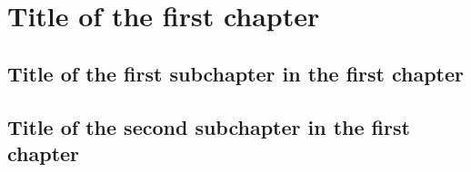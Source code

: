 \chapter{Title of the first chapter}

\section{Title of the first subchapter in the first chapter}

\section{Title of the second subchapter in the first chapter }


